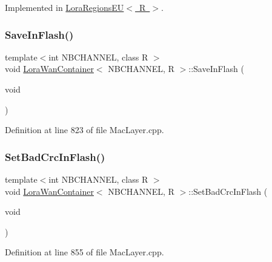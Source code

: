 Implemented in \mbox{\hyperlink{class_lora_regions_e_u_a1222a9362e7ba3715d9848af850af3f0}{Lora\+Regions\+E\+U$<$ R $>$}}.

\mbox{\label{class_lora_wan_container_a91e8c03b02a6672fe5f0342129618bb3}} 
\subsubsection{\texorpdfstring{Save\+In\+Flash()}{SaveInFlash()}}
{\footnotesize\ttfamily template$<$int N\+B\+C\+H\+A\+N\+N\+EL, class R $>$ \\
void \mbox{\hyperlink{class_lora_wan_container}{Lora\+Wan\+Container}}$<$ N\+B\+C\+H\+A\+N\+N\+EL, R $>$\+::Save\+In\+Flash (\begin{DoxyParamCaption}\item[{void}]{ }\end{DoxyParamCaption})}



Definition at line 823 of file Mac\+Layer.\+cpp.

\mbox{\label{class_lora_wan_container_a488791458e4b9098607d2f502da9d633}} 
\subsubsection{\texorpdfstring{Set\+Bad\+Crc\+In\+Flash()}{SetBadCrcInFlash()}}
{\footnotesize\ttfamily template$<$int N\+B\+C\+H\+A\+N\+N\+EL, class R $>$ \\
void \mbox{\hyperlink{class_lora_wan_container}{Lora\+Wan\+Container}}$<$ N\+B\+C\+H\+A\+N\+N\+EL, R $>$\+::Set\+Bad\+Crc\+In\+Flash (\begin{DoxyParamCaption}\item[{void}]{ }\end{DoxyParamCaption})}



Definition at line 855 of file Mac\+Layer.\+cpp.

\mbox{\label{class_lora_wan_container_a4e3a03ff91ae1ebca993206fc9d18c2d}} 

